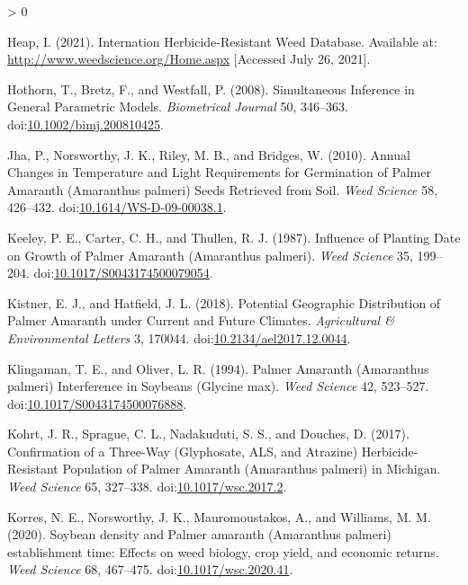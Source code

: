 \documentclass[utf8]{frontiersSCNS}
\newlength{\cslhangindent}
\newenvironment{CSLReferences}[2] %
 {%
  \setlength{\parindent}{0pt}
  \ifodd #1 \everypar{\setlength{\hangindent}{\cslhangindent}}\ignorespaces\fi
  \ifnum #2 > 0
  \setlength{\parskip}{#2\baselineskip}
  \fi
 }%
 {}
\begin{document}
\begin{CSLReferences}{1}{0}
\leavevmode\hypertarget{ref-heap2021}{}%
Heap, I. (2021). Internation {Herbicide}-{Resistant Weed Database}.
Available at: \url{http://www.weedscience.org/Home.aspx} {[}Accessed
July 26, 2021{]}.

\leavevmode\hypertarget{ref-hothorn2008}{}%
Hothorn, T., Bretz, F., and Westfall, P. (2008). Simultaneous
{Inference} in {General Parametric Models}. \emph{Biometrical Journal}
50, 346--363.
doi:\href{https://doi.org/10.1002/bimj.200810425}{10.1002/bimj.200810425}.

\leavevmode\hypertarget{ref-jha2010}{}%
Jha, P., Norsworthy, J. K., Riley, M. B., and Bridges, W. (2010). Annual
{Changes} in {Temperature} and {Light Requirements} for {Germination} of
{Palmer Amaranth} ({Amaranthus} palmeri) {Seeds Retrieved} from {Soil}.
\emph{Weed Science} 58, 426--432.
doi:\href{https://doi.org/10.1614/WS-D-09-00038.1}{10.1614/WS-D-09-00038.1}.

\leavevmode\hypertarget{ref-keeley1987}{}%
Keeley, P. E., Carter, C. H., and Thullen, R. J. (1987). Influence of
{Planting Date} on {Growth} of {Palmer Amaranth} ({Amaranthus} palmeri).
\emph{Weed Science} 35, 199--204.
doi:\href{https://doi.org/10.1017/S0043174500079054}{10.1017/S0043174500079054}.

\leavevmode\hypertarget{ref-kistner2018}{}%
Kistner, E. J., and Hatfield, J. L. (2018). Potential {Geographic
Distribution} of {Palmer Amaranth} under {Current} and {Future
Climates}. \emph{Agricultural \& Environmental Letters} 3, 170044.
doi:\href{https://doi.org/10.2134/ael2017.12.0044}{10.2134/ael2017.12.0044}.

\leavevmode\hypertarget{ref-klingaman1994}{}%
Klingaman, T. E., and Oliver, L. R. (1994). Palmer {Amaranth}
({Amaranthus} palmeri) {Interference} in {Soybeans} ({Glycine} max).
\emph{Weed Science} 42, 523--527.
doi:\href{https://doi.org/10.1017/S0043174500076888}{10.1017/S0043174500076888}.

\leavevmode\hypertarget{ref-kohrt2017}{}%
Kohrt, J. R., Sprague, C. L., Nadakuduti, S. S., and Douches, D. (2017).
Confirmation of a {Three}-{Way} ({Glyphosate}, {ALS}, and {Atrazine})
{Herbicide}-{Resistant Population} of {Palmer Amaranth} ({Amaranthus}
palmeri) in {Michigan}. \emph{Weed Science} 65, 327--338.
doi:\href{https://doi.org/10.1017/wsc.2017.2}{10.1017/wsc.2017.2}.

\leavevmode\hypertarget{ref-korres2020}{}%
Korres, N. E., Norsworthy, J. K., Mauromoustakos, A., and Williams, M.
M. (2020). Soybean density and {Palmer} amaranth ({Amaranthus} palmeri)
establishment time: Effects on weed biology, crop yield, and economic
returns. \emph{Weed Science} 68, 467--475.
doi:\href{https://doi.org/10.1017/wsc.2020.41}{10.1017/wsc.2020.41}.


\end{CSLReferences}
\end{document}
